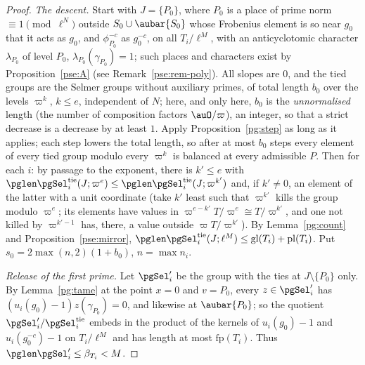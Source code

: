 \documentclass[10pt]{amsart}
\theoremstyle{definition}
\theoremstyle{remark}
\begin{document}
\begin{proof}
\emph{The descent.} Start with $J=\{P_0\}$, where $P_0$ is a place of prime norm $\equiv1
\pmod{\ell^N}$ outside $S_0\cup\aubar{S_0}$ whose Frobenius element is so near $g_0$ that it acts
as $g_0$, and $\phi_{P_0}^{-c}$ as $g_0^{-c}$, on all $T_i/\ell^M$, with an anticyclotomic
character $\lambda_{P_0}$ of level $P_0$, $\lambda_{P_0}(\gamma_{P_0})=1$; such places and characters exist by Proposition~\ref{pse:A} (see Remark~\ref{pse:rem-poly}). All slopes are $0$, and the tied groups are the Selmer
groups without auxiliary primes, of total length $b_0$ over the levels $\varpi^k$, $k\le e$,
independent of $N$; here, and only here, $b_0$ is the \emph{unnormalised} length (the number of
composition factors $\auO/\varpi$), an integer, so that a strict decrease is a decrease by at least
$1$. Apply Proposition~\ref{pg:step} as long as it applies; each step lowers the
total length, so after at most $b_0$ steps every element of every tied group modulo every
$\varpi^k$ is balanced at every admissible $P$. Then for each $i$: by passage to the exponent,
there is $k'\le e$ with $\pglen\pgSel^{\mathrm{tie}}_i(J;\varpi^e)\le\pglen\pgSel^{\mathrm{tie}}_i
(J;\varpi^{k'})$ and, if $k'\ne0$, an element of the latter with a unit coordinate (take $k'$
least such that $\varpi^{k'}$ kills the group modulo $\varpi^e$; its elements have values in
$\varpi^{e-k'}T/\varpi^e\cong T/\varpi^{k'}$, and one not killed by $\varpi^{k'-1}$ has, there, a
value outside $\varpi T/\varpi^{k'}$). By Lemma~\ref{pg:count} and Proposition~\ref{pse:mirror},
$\pglen\pgSel^{\mathrm{tie}}_i(J;\ell^M)\le\mathrm{gl}(T_i)+\mathrm{pl}(T_i)$. Put $s_0=2\max(n,2)(1+b_0)$,
$n=\max n_i$.

\emph{Release of the first prime.} Let $\pgSel'_i$ be the group with the ties at $J\setminus
\{P_0\}$ only. By Lemma~\ref{pg:tame} at the point $x=0$ and $v=P_0$, every $z\in\pgSel_i'$ has
$(u_i(g_0)-1)z(\gamma_{P_0})=0$, and likewise at $\aubar{P_0}$; so the quotient
$\pgSel'_i/\pgSel_i^{\mathrm{tie}}$ embeds in the product of the kernels of $u_i(g_0)-1$ and
$u_i(g_0^{-c})-1$ on $T_i/\ell^M$ and has length at most $\mathrm{fp}(T_i)$. Thus
$\pglen\pgSel_i'\le\beta_{T_i}<M$.


\end{proof}
\end{document}
